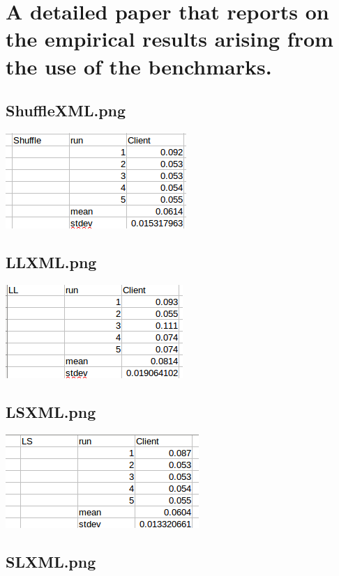 \documentclass{article}
\begin{document}
\section{A detailed paper that reports on the empirical results arising from the use of the benchmarks.}

\subsection{ShuffleXML.png}

\includegraphics[scale=1.0]{ShuffleXML.png}

\subsection{LLXML.png}

\includegraphics[scale=1.0]{LLXML.png}

\subsection{LSXML.png}

\includegraphics[scale=1.0]{LSXML.png}

\subsection{SLXML.png}
\end{document}
